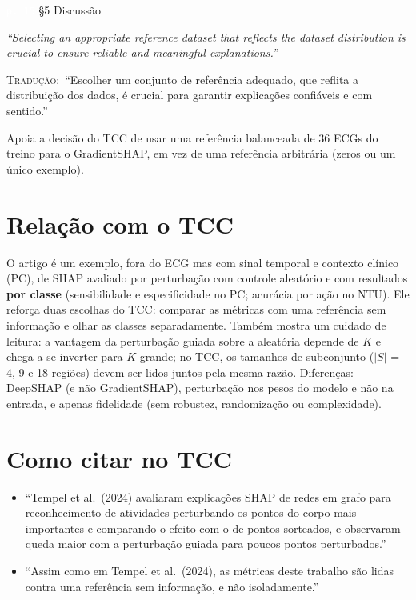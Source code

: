 \documentclass[11pt,a4paper]{article}
\newcommand{\pagechip}[1]{{\setlength{\fboxsep}{1.5pt}\colorbox{cAcc}{\textcolor{white}{\scriptsize\texttt{#1}}}}}
\newenvironment{origquote}{\par\itshape\small}{\par}
\newenvironment{tradquote}{\par\small\textsc{Tradução:}\ }{\par}
\newcommand{\explab}[1]{\par\smallskip{\small\color{cAcc}\textbf{\MakeUppercase{#1}}}\par}
\begin{document}
\begin{citacard}{\pagechip{p. 15} §5 Discussão}
\begin{origquote}“Selecting an appropriate reference dataset that reflects the dataset distribution is crucial to ensure reliable and meaningful explanations.”\end{origquote}
\begin{tradquote}“Escolher um conjunto de referência adequado, que reflita a distribuição dos dados, é crucial para garantir explicações confiáveis e com sentido.”\end{tradquote}
\explab{Explicação}
Apoia a decisão do TCC de usar uma referência balanceada de 36 ECGs do treino para o GradientSHAP, em vez de uma referência arbitrária (zeros ou um único exemplo).
\end{citacard}

\section{Relação com o TCC}
O artigo é um exemplo, fora do ECG mas com sinal temporal e contexto clínico (PC), de SHAP avaliado por perturbação com controle aleatório e com resultados \textbf{por classe} (sensibilidade e especificidade no PC; acurácia por ação no NTU). Ele reforça duas escolhas do TCC: comparar as métricas com uma referência sem informação e olhar as classes separadamente. Também mostra um cuidado de leitura: a vantagem da perturbação guiada sobre a aleatória depende de $K$ e chega a se inverter para $K$ grande; no TCC, os tamanhos de subconjunto ($|S|$ = 4, 9 e 18 regiões) devem ser lidos juntos pela mesma razão. Diferenças: DeepSHAP (e não GradientSHAP), perturbação nos pesos do modelo e não na entrada, e apenas fidelidade (sem robustez, randomização ou complexidade).

\section{Como citar no TCC}
\begin{itemize}
\item “Tempel et al.\ (2024) avaliaram explicações SHAP de redes em grafo para reconhecimento de atividades perturbando os pontos do corpo mais importantes e comparando o efeito com o de pontos sorteados, e observaram queda maior com a perturbação guiada para poucos pontos perturbados.”
\item “Assim como em Tempel et al.\ (2024), as métricas deste trabalho são lidas contra uma referência sem informação, e não isoladamente.”
\end{itemize}
\end{document}

